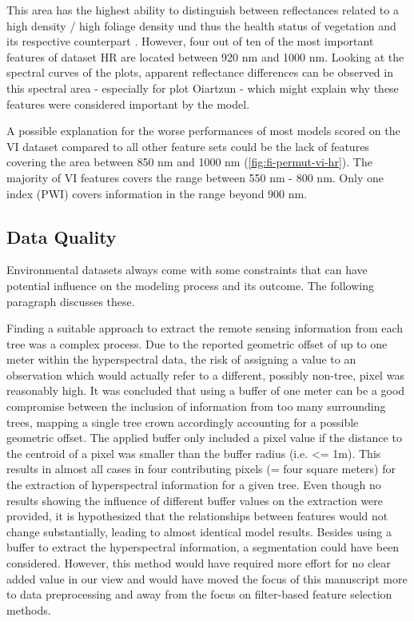 \documentclass[journal]{IEEEtran}
\begin{document}
This area has the highest ability to distinguish between reflectances related to a high density / high foliage density und thus the health status of vegetation and its respective counterpart \cite{horler1983}.
However, four out of ten of the most important features of dataset HR are located between 920 nm and 1000 nm.
Looking at the spectral curves of the plots, apparent reflectance differences can be observed in this spectral area - especially for plot Oiartzun - which might explain why these features were considered important by the model.

A possible explanation for the worse performances of most models scored on the VI dataset compared to all other feature sets could be the lack of features covering the area between 850 nm and 1000 nm (\autoref{fig:fi-permut-vi-hr}).
The majority of VI features covers the range between 550 nm - 800 nm.
Only one index (PWI) covers information in the range beyond 900 nm.

\subsection{Data Quality}
\label{subsec:data-quality}

Environmental datasets always come with some constraints that can have potential influence on the modeling process and its outcome.
The following paragraph discusses these.

Finding a suitable approach to extract the remote sensing information from each tree was a complex process.
Due to the reported geometric offset of up to one meter within the hyperspectral data, the risk of assigning a value to an observation which would actually refer to a different, possibly non-tree, pixel was reasonably high.
It was concluded that using a buffer of one meter can be a good compromise between the inclusion of information from too many surrounding trees, mapping a single tree crown accordingly accounting for a possible geometric offset.
The applied buffer only included a pixel value if the distance to the centroid of a pixel was smaller than the buffer radius (i.e. <= 1m).
This results in almost all cases in four contributing pixels (= four square meters) for the extraction of hyperspectral information for a given tree.
Even though no results showing the influence of different buffer values on the extraction were provided, it is hypothesized that the relationships between features would not change substantially, leading to almost identical model results.
Besides using a buffer to extract the hyperspectral information, a segmentation could have been considered.
However, this method would have required more effort for no clear added value in our view and would have moved the focus of this manuscript more to data preprocessing and away from the focus on filter-based feature selection methods.
\end{document}
